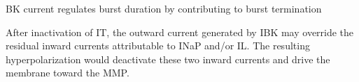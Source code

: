 \documentclass[11pt]{article}
\begin{document}
BK current regulates burst duration by contributing to burst termination \cite{liuMultipleConductancesCooperatively2008}

After inactivation of IT, the outward current generated by IBK may override the residual
inward currents attributable to INaP and/or IL. The resulting hyperpolarization would
deactivate these two inward currents and drive the membrane toward the MMP. \cite{liuMultipleConductancesCooperatively2008}














\end{document}
